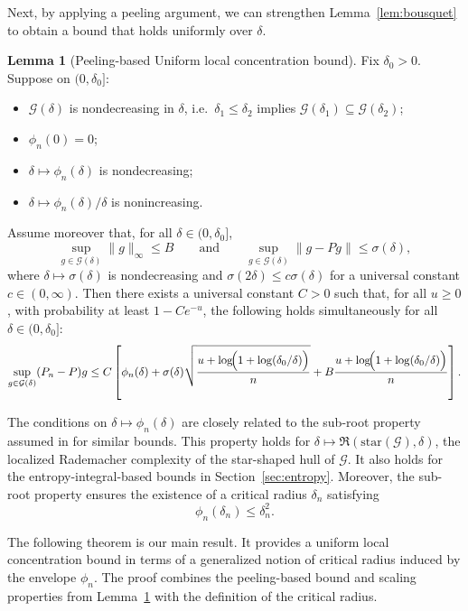 \documentclass[11pt]{article}
\theoremstyle{plain}
\theoremstyle{definition} %
\newtheorem{lemma}{Lemma}
\begin{document}
Next, by applying a peeling argument, we can strengthen Lemma~\ref{lem:bousquet} to obtain a bound that holds uniformly over \(\delta\).

 

\begin{lemma}[Peeling-based Uniform local concentration bound]
\label{lem:local-peeling}
Fix $\delta_0 > 0$. Suppose on $(0, \delta_0]$:
\begin{itemize}
\item \(\mathcal G(\delta)\) is nondecreasing in \(\delta\), i.e.\ \(\delta_1\le \delta_2\) implies \(\mathcal G(\delta_1)\subseteq \mathcal G(\delta_2)\);
\item \(\phi_n(0)=0\);
\item \(\delta\mapsto \phi_n(\delta)\) is nondecreasing;
\item \(\delta\mapsto \phi_n(\delta)/\delta\) is nonincreasing.
\end{itemize}
 Assume moreover that, for all \(\delta\in(0,\delta_0]\),
\[
\sup_{g\in\mathcal G(\delta)}\|g\|_\infty \le B
\qquad\text{and}\qquad
\sup_{g\in\mathcal G(\delta)} \|g-Pg\| \leq \sigma(\delta) ,
\]
where $\delta \mapsto \sigma(\delta) $ is nondecreasing and \(\sigma(2\delta)\leq c \sigma(\delta)\) for a universal constant $c \in (0,\infty)$.
Then there exists a universal constant \(C>0\) such that, for all \(u\ge 0\), with probability at least \(1-Ce^{-u}\), the following holds simultaneously for all \(\delta\in(0,\delta_0]\):
\[
\sup_{g\in\mathcal G(\delta)} (P_n-P)g
\le
C\left[
\phi_n(\delta)
+
\sigma(\delta)\sqrt{\frac{u+\log\!\Bigl(1+\log(\delta_0/\delta)\Bigr)}{n}}
+
B\frac{u+\log\!\Bigl(1+\log(\delta_0/\delta)\Bigr)}{n}
\right].
\]
\end{lemma}


The conditions on \(\delta \mapsto \phi_n(\delta)\) are closely related to the sub-root property assumed in \cite{bartlett2005local} for similar bounds. This property holds for \(\delta \mapsto \mathfrak{R}(\mathrm{star}(\mathcal{G}),\delta)\), the localized Rademacher complexity of the star-shaped hull of \(\mathcal{G}\). It also holds for the entropy-integral-based bounds in Section~\ref{sec:entropy}. Moreover, the sub-root property ensures the existence of a critical radius \(\delta_n\) satisfying
\[
\phi_n(\delta_n)\le \delta_n^2.
\]

The following theorem is our main result. It provides a uniform local concentration bound in terms of a generalized notion of critical radius induced by the envelope \(\phi_n\). The proof combines the peeling-based bound and scaling properties from Lemma~\ref{lem:local-peeling} with the definition of the critical radius.
\end{document}

